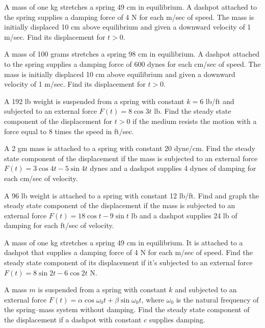 \begin{exerciselist}
  \item\label{exer:6.2.15} A mass of one kg stretches a spring 49 cm in equilibrium. A dashpot
        attached to the spring supplies a damping force of 4 N for each m/sec of speed. The mass is
        initially displaced 10 cm above equilibrium and given a downward velocity of 1 m/sec. Find
        its displacement for $t>0$.

  \item\label{exer:6.2.16} A mass of 100 grams stretches a spring 98 cm in equilibrium. A dashpot
        attached to the spring supplies a damping force of 600 dynes for each cm/sec of speed. The
        mass is initially displaced 10 cm above equilibrium and given a downward velocity of 1
        m/sec. Find its displacement for $t>0$.

  \item\label{exer:6.2.17} A 192 lb weight is suspended from a spring with constant $k=6$ lb/ft and
        subjected to an external force $F(t)=8\cos3t$ lb. Find the steady state component of the
        displacement for $t>0$ if the medium resists the motion with a force equal to 8 times the
        speed in ft/sec.

  \item\label{exer:6.2.18} A 2 gm mass is attached to a spring with constant 20 dyne/cm. Find the
        steady state component of the displacement if the mass is subjected to an external force
        $F(t)=3\cos4t-5\sin4t$ dynes and a dashpot supplies 4 dynes of damping for each cm/sec of
        velocity.

  \item\label{exer:6.2.19} \CGex A 96 lb weight is attached to a spring with constant 12 lb/ft. Find
        and graph the steady state component of the displacement if the mass is subjected to an
        external force $F(t)=18\cos t-9\sin t$ lb and a dashpot supplies 24 lb of damping for each
        ft/sec of velocity.

  \item\label{exer:6.2.20} A mass of one kg stretches a spring 49 cm in equilibrium. It is attached
        to a dashpot that supplies a damping force of 4 N for each m/sec of speed. Find the steady
        state component of its displacement if it's subjected to an external force
        $F(t)=8\sin2t-6\cos2t$ N.

  \item\label{exer:6.2.21} A mass $m$ is suspended from a spring with constant $k$ and subjected to
        an external force $F(t)=\alpha\cos\omega_{0}t+\beta\sin\omega_{0}t$, where $\omega_{0}$ is
        the natural frequency of the spring--mass system without damping. Find the steady state
        component of the displacement if a dashpot with constant $c$ supplies damping.


\end{exerciselist}
